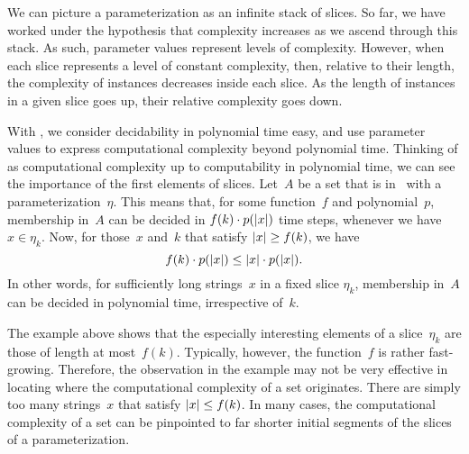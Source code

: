\label{sec:redundancy}%

We can picture a parameterization as an infinite stack of slices.
So far, we have worked under the hypothesis that complexity increases as we ascend through this stack.
As such, parameter values represent levels of complexity.
However, when each slice represents a level of constant complexity, then, relative to their length, the complexity of instances decreases inside each slice.
As the length of instances in a given slice goes up, their relative complexity goes down.

\begin{example}
\label{ex:long_instances}%
  With , we consider decidability in polynomial time easy, and use parameter values to express computational complexity beyond polynomial time.
  Thinking of  as computational complexity up to computability in polynomial time, we can see the importance of the first elements of slices.
  Let~$A$ be a set that is in~ with a parameterization~$\eta$.
  This means that, for some function~$f$ and polynomial~$p$, membership in~$A$ can be decided in $f(k) \cdot p({\lvert x\rvert})$ time steps, whenever we have $x \in \eta_k$.
  Now, for those~$x$ and~$k$ that satisfy ${\lvert x\rvert} \ge f(k)$, we have
  \begin{equation*}
    f(k) \cdot p({\lvert x\rvert}) \le {\lvert x\rvert} \cdot p({\lvert x\rvert}).
  \end{equation*}
  In other words, for sufficiently long strings~$x$ in a fixed slice $\eta_k$, membership in~$A$ can be decided in polynomial time, irrespective of~$k$.
\end{example}

The example above shows that the especially interesting elements of a slice~$\eta_k$ are those of length at most~$f(k)$.
Typically, however, the function~$f$ is rather fast-growing.
Therefore, the observation in the example may not be very effective in locating where the computational complexity of a set originates.
There are simply too many strings~$x$ that satisfy ${\lvert x\rvert} \le f(k)$.
In many cases, the computational complexity of a set can be pinpointed to far shorter initial segments of the slices of a parameterization.

